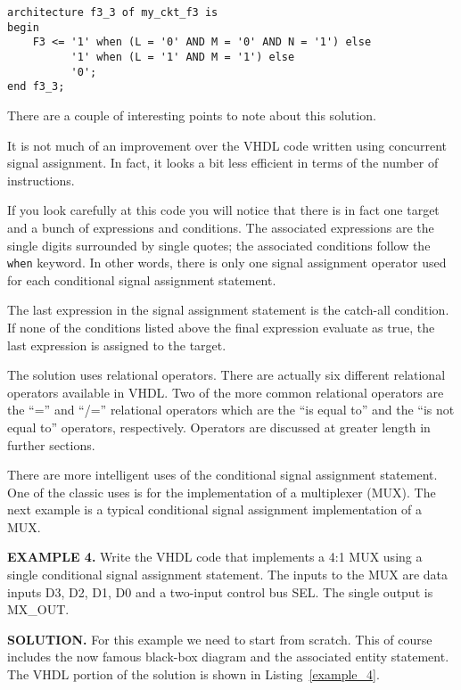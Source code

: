 \noindent
\begin{minipage}{0.99\linewidth}
\begin{lstlisting}[label=example_3, caption=Solution of Example~3.]
architecture f3_3 of my_ckt_f3 is
begin
	F3 <= '1' when (L = '0' AND M = '0' AND N = '1') else
	      '1' when (L = '1' AND M = '1') else
	      '0';
end f3_3;
\end{lstlisting}
\end{minipage}

There are a couple of interesting points to note about this solution.
\begin{my_list}
\item It is not much of an improvement over the VHDL code written using concurrent signal assignment. In fact, it looks a bit less efficient in terms of the number of instructions.
\item If you look carefully at this code you will notice that there is in fact one target and a bunch of expressions and conditions. The associated expressions are the single digits surrounded by single quotes; the associated conditions follow the \texttt{when} keyword. In other words, there is only one signal assignment operator used for each conditional signal assignment statement.
\item The last expression in the signal assignment statement is the catch-all condition. If none of the conditions listed above the final expression evaluate as true, the last expression is assigned to the target.
\item The solution uses relational operators. There are actually six different relational operators available in VHDL. Two of the more common relational operators are the ``='' and ``/='' relational operators which are the ``is equal to'' and the ``is not equal to'' operators, respectively. Operators are discussed at greater length in further sections.
\end{my_list}
There are more intelligent uses of the conditional signal assignment statement. One of the classic uses is for the implementation of a multiplexer (MUX). The next example is a typical conditional signal assignment implementation of a MUX.

\begin{leftbar}
\noindent
\textbf{EXAMPLE 4.}
Write the VHDL code that implements a 4:1 MUX using a single conditional signal assignment statement. The inputs to the MUX are data inputs D3, D2, D1, D0 and a two-input control bus SEL. The single output is MX\_OUT.
\end{leftbar}
\noindent
\textbf{SOLUTION.} For this example we need to start from scratch. This of course includes the now famous black-box diagram and the associated entity statement. The VHDL portion of the solution is shown in Listing~\ref{example_4}.

